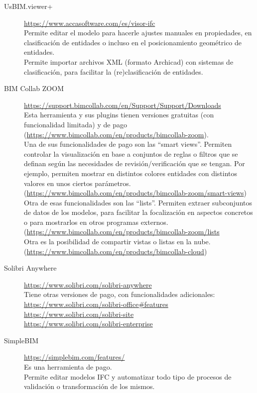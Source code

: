 \documentclass[spanish,10pt,a4paper,final,oneside]{article}
\begin{document}
\begin{description}
\item[UsBIM.viewer+]
\url{https://www.accasoftware.com/es/visor-ifc}
\\Permite editar el modelo para hacerle ajustes manuales en propiedades, en clasificación de entidades o incluso en el posicionamiento geométrico de entidades.
\\Permite importar archivos XML (formato Archicad) con sistemas de clasificación, para facilitar la (re)clasificación de entidades.


\item[BIM Collab ZOOM]
\url{https://support.bimcollab.com/en/Support/Support/Downloads}
\\Esta herramienta y sus plugins tienen versiones gratuitas (con funcionalidad limitada) y de pago (\url{https://www.bimcollab.com/en/products/bimcollab-zoom}).
\\Una de sus funcionalidades de pago son las ``smart views''. Permiten controlar la visualización en base a conjuntos de reglas o filtros que se definan según las necesidades de revisión/verificación que se tengan. Por ejemplo, permiten mostrar en distintos colores entidades con distintos valores en unos ciertos parámetros. (\url{https://www.bimcollab.com/en/products/bimcollab-zoom/smart-views})
\\Otra de esas funcionalidades son las ``lists''. Permiten extraer subconjuntos de datos de los modelos, para facilitar la focalización en aspectos concretos o para mostrarlos en otros programas externos. (\url{https://www.bimcollab.com/en/products/bimcollab-zoom/lists}
\\Otra es la posibilidad de compartir vistas o listas en la nube. (\url{https://www.bimcollab.com/en/products/bimcollab-cloud}) 

\item[Solibri Anywhere]
\url{https://www.solibri.com/solibri-anywhere}
\\Tiene otras versiones de pago, con funcionalidades adicionales:
\\ \url{https://www.solibri.com/solibri-office#features}
\\ \url{https://www.solibri.com/solibri-site}
\\ \url{https://www.solibri.com/solibri-enterprise}

\item[SimpleBIM]
\url{https://simplebim.com/features/}
\\Es una herramienta de pago.
\\Permite editar modelos IFC y automatizar todo tipo de procesos de validación o transformación de los mismos.

\end{description}
\end{document}
